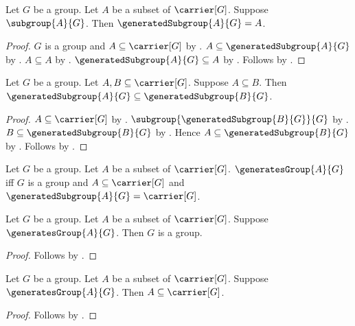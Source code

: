 \begin{corollary}\label{generated_subgroup_of_subgroup}
    Let $G$ be a group.
    Let $A$ be a subset of $\carrier[G]$.
    Suppose $\subgroup{A}{G}$.
    Then $\generatedSubgroup{A}{G}=A$.
\end{corollary}
\begin{proof}
    $G$ is a group and $A\subseteq\carrier[G]$ by
        .
    $A\subseteq\generatedSubgroup{A}{G}$ by
        .
    $A\subseteq A$ by .
    $\generatedSubgroup{A}{G}\subseteq A$ by
        .
    Follows by .
\end{proof}

\begin{proposition}\label{generated_subgroup_monotone}
    Let $G$ be a group.
    Let $A,B\subseteq\carrier[G]$.
    Suppose $A\subseteq B$.
    Then $\generatedSubgroup{A}{G}\subseteq
        \generatedSubgroup{B}{G}$.
\end{proposition}
\begin{proof}
    $A\subseteq\carrier[G]$ by .
    $\subgroup{\generatedSubgroup{B}{G}}{G}$ by
        .
    $B\subseteq\generatedSubgroup{B}{G}$ by
        .
    Hence $A\subseteq\generatedSubgroup{B}{G}$ by
        .
    Follows by .
\end{proof}

\begin{definition}\label{generates_group}
    Let $G$ be a group.
    Let $A$ be a subset of $\carrier[G]$.
    $\generatesGroup{A}{G}$ iff
        $G$ is a group and
        $A\subseteq\carrier[G]$ and
        $\generatedSubgroup{A}{G}=\carrier[G]$.
\end{definition}

\begin{proposition}\label{generates_group_is_group}
    Let $G$ be a group.
    Let $A$ be a subset of $\carrier[G]$.
    Suppose $\generatesGroup{A}{G}$.
    Then $G$ is a group.
\end{proposition}
\begin{proof}
    Follows by .
\end{proof}

\begin{proposition}\label{generates_group_subseteq_carrier}
    Let $G$ be a group.
    Let $A$ be a subset of $\carrier[G]$.
    Suppose $\generatesGroup{A}{G}$.
    Then $A\subseteq\carrier[G]$.
\end{proposition}
\begin{proof}
    Follows by .
\end{proof}

